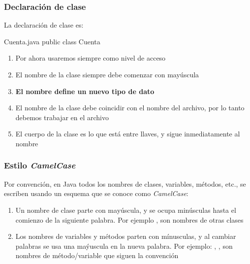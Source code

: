 \documentclass{beamer}
\begin{document}
\begin{frame}[fragile]
  \frametitle{Declaración de clase}

  La declaración de clase es:
  
  \begin{java}{Cuenta.java}
    public class Cuenta
  \end{java}

  \begin{enumerate}
  \item Por ahora usaremos siempre  como nivel de acceso    
  \item El nombre de la clase siempre debe comenzar con mayúscula    
  \item \textbf{El nombre define un nuevo tipo de dato}
  \item El nombre de la clase debe coincidir con el nombre del
    archivo, por lo tanto debemos trabajar en el archivo
  \item El cuerpo de la clase es lo que está entre llaves, y sigue
    inmediatamente al nombre
  \end{enumerate}
  
\end{frame}

\begin{frame}[fragile]
  \frametitle{Estilo \emph{CamelCase}}

  Por convención, en Java todos los nombres de clases, variables,
  métodos, etc., se escriben usando un esquema que se conoce como
  \emph{CamelCase}:

  \begin{enumerate}
  \item Un nombre de clase parte con mayúscula, y se ocupa minúsculas
    hasta el comienzo de la siguiente palabra. Por ejemplo
    ,  son nombres de otras
    clases
    
  \item Los nombres de variables y métodos parten con mínusculas, y al
    cambiar palabras se usa una maýuscula en la nueva palabra. Por
    ejemplo: , , son nombres de
    método/variable que siguen la convención
  \end{enumerate}  

\end{frame}
\end{document}
